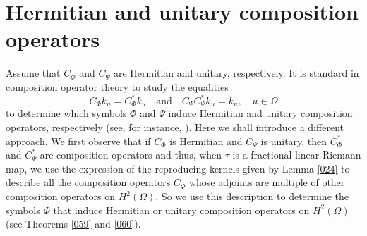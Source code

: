 \documentclass[11pt]{amsart}%
\newtheorem{cor}[thm]{Corollary}
\newtheorem{pps}[thm]{Proposition}
\theoremstyle{definition}
\theoremstyle{remark}
\numberwithin{equation}{section}
\begin{document}


\section{Hermitian and unitary composition operators}

\label{097} Assume that $C_{\Phi}$ and $C_{\Psi}$ are Hermitian and unitary,
respectively. It is standard in composition operator theory to study the equalities
\[
C_{\Phi}k_{u}=C_{\Phi}^{\ast}k_{u}\quad\text{and}\quad C_{\Psi}C_{\Psi}^{\ast
}k_{u}=k_{u},\quad u\in\Omega
\]
to determine which symbols $\Phi$ and $\Psi$ induce Hermitian and unitary
composition operators, respectively (see, for instance, \cite{Paul2, Cowen-Ko,
Gajath, Jovic}). Here we shall introduce a different approach. We first
observe that if $C_{\Phi}$ is Hermitian and $C_{\Psi}$ is unitary, then
$C_{\Phi}^{\ast}$ and $C_{\Psi}^{\ast}$ are composition operators and thus,
when $\tau$ is a fractional linear Riemann
map, we use the expression of the reproducing kernels given by Lemma \ref{024}
to describe all the composition operators $C_{\Phi}$ whose adjoints are
multiple of other composition operators on $H^{2}(\Omega).$ So we use this
description to determine the symbols $\Phi$ that induce Hermitian or unitary
composition operators on $H^{2}(\Omega)$ (see Theorems \ref{059} and \ref{060}).
\end{document}
